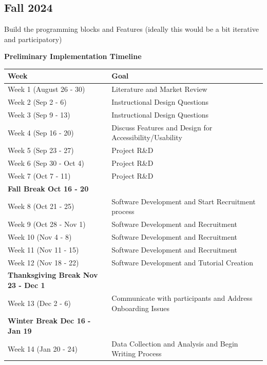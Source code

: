 \documentclass[manuscript,screen,review]{acmart}
\begin{document}
\subsection{Fall 2024}
Build the programming blocks and Features (ideally this would be a bit iterative and participatory)



\textbf{Preliminary Implementation Timeline}



\begin{table}[h]
\begin{tabular}{@{}ll@{}}
\toprule
\textbf{Week}                 & \textbf{Goal}                               \\ \midrule
Week 1 (August 26 - 30) & Literature and Market Review      \\
Week 2 (Sep 2 - 6)   & Instructional Design Questions    \\
Week 3 (Sep 9 - 13)  & Instructional Design Questions    \\
Week 4 (Sep 16 - 20) & Discuss Features and Design for Accessibility/Usability \\
Week 5 (Sep 23 - 27) & Project R\&D                      \\
Week 6 (Sep 30 - Oct 4) & Project R\&D                     \\
Week 7 (Oct 7 - 11)  & Project R\&D                      \\ \midrule
\textbf{Fall Break Oct 16 - 20} &                                \\ \midrule
Week 8 (Oct 21 - 25) & Software Development and Start Recruitment process \\
Week 9 (Oct 28 - Nov 1) & Software Development and Recruitment \\
Week 10 (Nov 4 - 8)  & Software Development and Recruitment \\
Week 11 (Nov 11 - 15) & Software Development and Recruitment \\
Week 12 (Nov 18 - 22) & Software Development and Tutorial Creation \\ \midrule
\textbf{Thanksgiving Break Nov 23 - Dec 1} &                   \\ \midrule
Week 13 (Dec 2 - 6)  & Communicate with participants and Address Onboarding Issues \\ \midrule
\textbf{Winter Break Dec 16 - Jan 19} &                           \\ \midrule
Week 14 (Jan 20 - 24) & Data Collection and Analysis and Begin Writing Process\\

\end{tabular}
\end{table}
\end{document}
